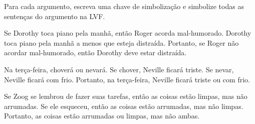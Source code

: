 \problempart
Para cada argumento, escreva uma chave de simbolização e simbolize todas as sentenças do argumento na LVF.
\begin{compactlist}
\item Se Dorothy toca piano pela manhã, então Roger acorda mal-humorado. Dorothy toca piano pela manhã a menos que esteja distraída. Portanto, se Roger não acordar mal-humorado, então Dorothy deve estar distraída.
\item[] 
\item Na terça-feira, choverá ou nevará. Se chover, Neville ficará triste. Se nevar, Neville ficará com frio. Portanto, na terça-feira, Neville ficará triste ou com frio.
\item[] 
\item Se Zoog se lembrou de fazer suas tarefas, então as coisas estão limpas, mas não arrumadas. Se ele esqueceu, então as coisas estão arrumadas, mas não limpas. Portanto, as coisas estão arrumadas ou limpas, mas não ambas.
\item[] 
\end{compactlist}

